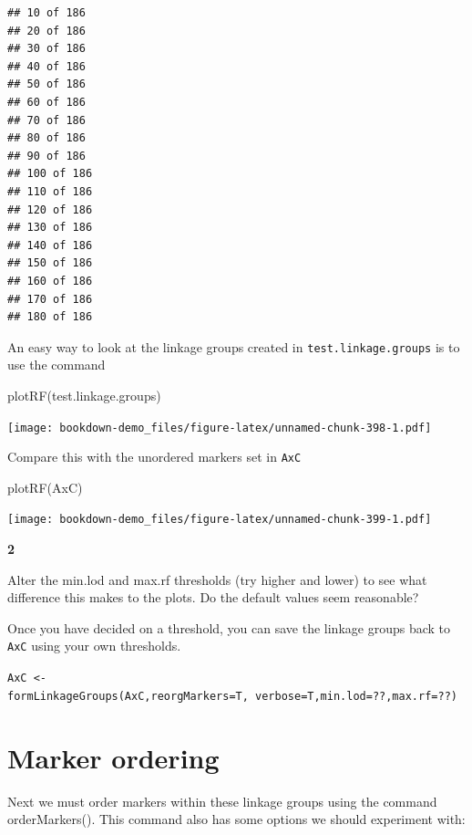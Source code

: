 \documentclass[
]{book}
\makeatletter
\newenvironment{Shaded}{\begin{snugshade}}{\end{snugshade}}
\newcommand{\FunctionTok}[1]{\textcolor[rgb]{0.00,0.00,0.00}{#1}}
\newcommand{\NormalTok}[1]{#1}
\newenvironment{kframe}{%
\medskip{}
\setlength{\fboxsep}{.8em}
 \def\at@end@of@kframe{}%
 \ifinner\ifhmode%
  \def\at@end@of@kframe{\end{minipage}}%
  \begin{minipage}{\columnwidth}%
 \fi\fi%
 \def\FrameCommand##1{\hskip\@totalleftmargin \hskip-\fboxsep
 \colorbox{shadecolor}{##1}\hskip-\fboxsep
     \hskip-\linewidth \hskip-\@totalleftmargin \hskip\columnwidth}%
 \MakeFramed {\advance\hsize-\width
   \@totalleftmargin\z@ \linewidth\hsize
   \@setminipage}}%
 {\par\unskip\endMakeFramed%
 \at@end@of@kframe}
\newenvironment{rmdblock}[1]
  {
  \begin{itemize}
  \renewcommand{\labelitemi}{
    \raisebox{-.7\height}[0pt][0pt]{
      {\setkeys{Gin}{width=3em,keepaspectratio}\texttt{[image: images/\#1]}}
    }
  }
  \setlength{\fboxsep}{1em}
  \begin{kframe}
  \item
  }
  {
  \end{kframe}
  \end{itemize}
  }
\newenvironment{rmdquiz}
  {\begin{rmdblock}{quiz}}
  {\end{rmdblock}}
\makeatother
\begin{document}
\begin{verbatim}
## 10 of 186 
## 20 of 186 
## 30 of 186 
## 40 of 186 
## 50 of 186 
## 60 of 186 
## 70 of 186 
## 80 of 186 
## 90 of 186 
## 100 of 186 
## 110 of 186 
## 120 of 186 
## 130 of 186 
## 140 of 186 
## 150 of 186 
## 160 of 186 
## 170 of 186 
## 180 of 186
\end{verbatim}

An easy way to look at the linkage groups created in \texttt{test.linkage.groups} is to use the command

\begin{Shaded}
\begin{Highlighting}[]
\FunctionTok{plotRF}\NormalTok{(test.linkage.groups)}
\end{Highlighting}
\end{Shaded}

\texttt{[image: bookdown-demo\_files/figure-latex/unnamed-chunk-398-1.pdf]}

Compare this with the unordered markers set in \texttt{AxC}

\begin{Shaded}
\begin{Highlighting}[]
\FunctionTok{plotRF}\NormalTok{(AxC) }
\end{Highlighting}
\end{Shaded}

\texttt{[image: bookdown-demo\_files/figure-latex/unnamed-chunk-399-1.pdf]}
\begin{rmdquiz}
\textbf{2}

Alter the min.lod and max.rf thresholds (try higher and lower) to see what difference this makes to the plots. Do the default values seem reasonable?
\end{rmdquiz}

Once you have decided on a threshold, you can save the linkage groups back to \texttt{AxC} using your own thresholds.

\texttt{AxC\ \textless{}-formLinkageGroups(AxC,reorgMarkers=T,\ verbose=T,min.lod=??,max.rf=??)}

\hypertarget{marker-ordering}{%
\section{Marker ordering}\label{marker-ordering}}

Next we must order markers within these linkage groups using the command orderMarkers(). This command also has some options we should experiment with:
\end{document}
